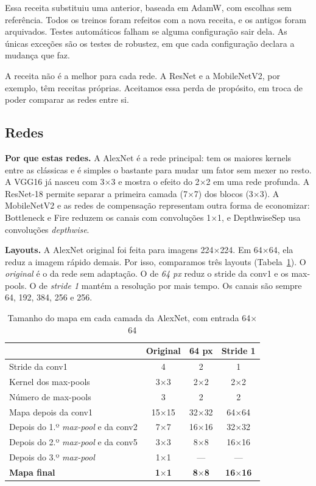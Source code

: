 \documentclass[conference]{IEEEtran}
\newcommand{\by}{\ensuremath{\times}}
\begin{document}
Essa receita substituiu uma anterior, baseada em AdamW, com escolhas sem referência. Todos os treinos foram refeitos com a nova receita, e os antigos foram arquivados.
Testes automáticos falham se alguma configuração sair dela. As únicas exceções são os testes de robustez, em que cada configuração declara a mudança que faz.

A receita não é a melhor para cada rede. A ResNet e a MobileNetV2, por exemplo, têm receitas próprias. Aceitamos essa perda de propósito, em troca de poder comparar as redes
entre si.

\subsection{Redes}

\textbf{Por que estas redes.} A AlexNet é a rede principal: tem os maiores kernels entre as clássicas e é simples o bastante para mudar um fator sem mexer no resto. A VGG16 já nasceu com
3\by3 e mostra o efeito do 2\by2 em uma rede profunda. A ResNet-18 permite separar a primeira camada (7\by7) dos blocos (3\by3). A MobileNetV2 e as redes de compensação representam
outra forma de economizar: Bottleneck e Fire \cite{iandola2016squeezenet} reduzem os canais com convoluções 1\by1, e DepthwiseSep usa convoluções \textit{depthwise}.

\textbf{Layouts.} A AlexNet original foi feita para imagens 224\by224. Em 64\by64, ela reduz a imagem rápido demais. Por isso, comparamos três layouts (Tabela~\ref{tab:arquitetura}). O
\textit{original} é o da rede sem adaptação. O de \textit{64 px} reduz o stride da conv1 e os max-pools. O de \textit{stride 1} mantém a resolução por mais tempo. Os canais são
sempre 64, 192, 384, 256 e 256.

\begin{table}[!t]
\caption{Tamanho do mapa em cada camada da AlexNet, com entrada 64\by64}
\label{tab:arquitetura}
\centering
\footnotesize
\setlength{\tabcolsep}{3pt}
\begin{tabular}{@{}lccc@{}}
\toprule
 & \textbf{Original} & \textbf{64 px} & \textbf{Stride 1} \\
\midrule
Stride da conv1 & 4 & 2 & 1 \\
Kernel dos max-pools & 3\by3 & 2\by2 & 2\by2 \\
Número de max-pools & 3 & 2 & 2 \\
\midrule
Mapa depois da conv1 & 15\by15 & 32\by32 & 64\by64 \\
Depois do 1.º \textit{max-pool} e da conv2 & 7\by7 & 16\by16 & 32\by32 \\
Depois do 2.º \textit{max-pool} e da conv5 & 3\by3 & 8\by8 & 16\by16 \\
Depois do 3.º \textit{max-pool} & 1\by1 & --- & --- \\
\midrule
\textbf{Mapa final} & \textbf{1\by1} & \textbf{8\by8} & \textbf{16\by16} \\
\bottomrule
\end{tabular}
\end{table}
\end{document}

